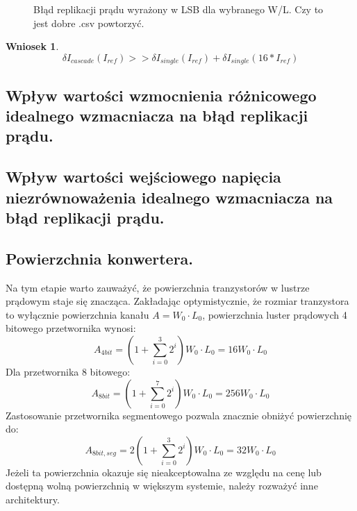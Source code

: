 \documentclass[10pt,a4paper]{report}
\theoremstyle{definition}
\theoremstyle{definition}
\theoremstyle{definition}
\theoremstyle{definition}
\theoremstyle{definition}
\newtheorem{wniosek}{Wniosek}[section]
\begin{document}
	
	\begin{figure}[!htb]
		\centering
		\caption{Błąd replikacji prądu wyrażony w LSB dla wybranego W/L. Czy to jest dobre .csv powtorzyć.}
	\end{figure}
	
	\begin{wniosek}{}
		\begin{equation}
			\delta I_{cascade}(I_{ref}) >> \delta I_{single}(I_{ref}) + \delta I_{single}(16*I_{ref}) 
		\end{equation}
	\end{wniosek}

	\subsection{Wpływ wartości wzmocnienia różnicowego idealnego wzmacniacza na błąd replikacji prądu.}
	\subsection{Wpływ wartości wejściowego napięcia niezrównoważenia idealnego wzmacniacza na błąd replikacji prądu.}
	\subsection{Powierzchnia konwertera.}
	{	Na tym etapie warto zauważyć, że powierzchnia tranzystorów w lustrze prądowym staje się znacząca. Zakładając optymistycznie, że rozmiar tranzystora to wyłącznie powierzchnia kanału $A=W_0\cdot L_0$, powierzchnia luster prądowych 4 bitowego przetwornika wynosi:
	\begin{equation}
		A_{4bit} =  \left( 1 + \sum_{i=0}^{3}2^i \right)   W_0 \cdot L_0= 16 W_0 \cdot L_0
	\end{equation}
	Dla przetwornika 8 bitowego:
	\begin{equation}
		A_{8bit} = \left( 1 + \sum_{i=0}^{7}2^i \right)   W_0 \cdot L_0 = 256 W_0 \cdot L_0
	\end{equation}
	Zastosowanie przetwornika segmentowego pozwala znacznie obniżyć powierzchnię do:
	\begin{equation}
		A_{8bit,seg} = 2\left( 1 + \sum_{i=0}^{3}2^i \right)   W_0 \cdot L_0 = 32 W_0 \cdot L_0
	\end{equation}
	Jeżeli ta powierzchnia okazuje się nieakceptowalna ze względu na cenę lub dostępną wolną powierzchnią w większym systemie, należy rozważyć inne architektury.
	}
	
\end{document}

